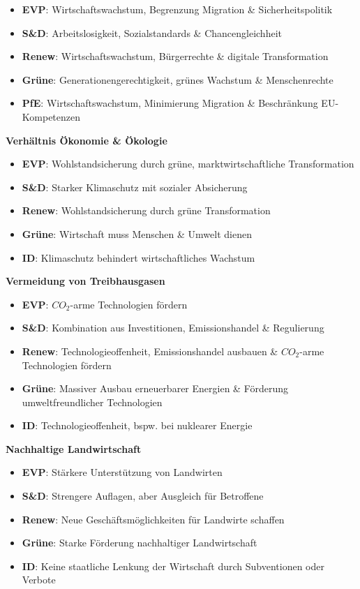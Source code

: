\documentclass[11pt]{article}
\newcommand{\themeOne}{Verhältnis \newline Ökonomie \& Ökologie}
\newcommand{\themeTwo}{Vermeidung von Treibhausgasen}
\newcommand{\themeThree}{Nachhaltige Landwirtschaft}
\newcommand{\evpOne}{\small Wohlstandsicherung durch grüne, marktwirtschaftliche Transformation}
\newcommand{\evpTwo}{\small $CO_2$-arme Technologien fördern}
\newcommand{\evpThree}{\small Stärkere Unterstützung von Landwirten}
\newcommand{\sdOne}{\small Starker Klimaschutz mit sozialer Absicherung}
\newcommand{\sdTwo}{\small Kombination aus Investitionen, Emissionshandel \& Regulierung}
\newcommand{\sdThree}{\small Strengere Auflagen, aber Ausgleich für Betroffene}
\newcommand{\reOne}{\small Wohlstandsicherung durch grüne Transformation}
\newcommand{\reTwo}{\small Technologieoffenheit, Emissionshandel ausbauen \& $CO_2$-arme Technologien fördern}
\newcommand{\reThree}{\small Neue Geschäftsmöglichkeiten für Landwirte schaffen}
\newcommand{\greenOne}{\small Wirtschaft muss Menschen \& Umwelt dienen}
\newcommand{\greenTwo}{\small Massiver Ausbau erneuerbarer Energien \& Förderung umweltfreundlicher Technologien}
\newcommand{\greenThree}{\small Starke Förderung nachhaltiger Landwirtschaft}
\newcommand{\idOne}{\small Klimaschutz behindert wirtschaftliches Wachstum}
\newcommand{\idTwo}{\small Technologieoffenheit, bspw. bei nuklearer Energie}
\newcommand{\idThree}{\small Keine staatliche Lenkung der Wirtschaft durch Subventionen oder Verbote}
\newcommand{\themeOne}{Lastenverteilung \newline in der EU}
\newcommand{\themeTwo}{Ausmaß der Kontrolle der EU-Außengrenzen}
\newcommand{\themeThree}{Strenge bezüglich Asylanträge \& Rückführungen}
\newcommand{\evpOne}{\small Fester Verteilungsmechanismus \& Asyl- und Migrationsfonds}
\newcommand{\evpTwo}{\small Stärkere Kontrolle \& Drittstaatenverfahren}
\newcommand{\evpThree}{\small Schnellere Rückführungen \& einheitliche Aufnahmebedingungen}
\newcommand{\sdOne}{\small Fester Verteilungsmechanismus, Asyl- und Migrationsfonds \& Unterstützung belastete Staaten}
\newcommand{\sdTwo}{\small Gesicherte Grenzen, aber keine Drittstaatenverfahren}
\newcommand{\sdThree}{\small Unterstützung bei Antrag \& Integration durch EASO}
\newcommand{\reOne}{\small Fester Verteilungsmechanismus \& Asyl- und Migrationsfonds}
\newcommand{\reTwo}{\small Stärkere Kontrolle \& Drittstaatenverfahren}
\newcommand{\reThree}{\small Schnellere Rückführungen \& einheitliche Aufnahmebedingungen}
\newcommand{\greenOne}{\small Fester Verteilungsmechanismus, Asyl- und Migrationsfonds \& Unterstützung belastete Staaten}
\newcommand{\greenTwo}{\small Ausbau der Seenotrettung \& Verhinderung von Drittstaatenverfahren}
\newcommand{\greenThree}{\small Humane Aufnahme von Schutzsuchenden \& Wahrung der Menschenrechte bei Rückführungen}
\newcommand{\idOne}{\small Keinerlei Verpflichtung der Mitgliedstaaten}
\newcommand{\idTwo}{\small Verhinderung illegaler Migration durch Abschottung}
\newcommand{\idThree}{\small Schnelle Rückführungen, maximal temporäre Aufnahme}
\newcommand{\themeOne}{Internationale \newline Kooperation}
\newcommand{\themeTwo}{Militärische vs. zivile Interventionen}
\newcommand{\themeThree}{Erhöhung von Verteidigungsausgaben}
\newcommand{\evpOne}{\small Ergänzung mit NATO \& keine Parallelstrukturen}
\newcommand{\evpTwo}{\small EU muss Truppen in Krisensituationen schicken können}
\newcommand{\evpThree}{\small Sowohl auf europäischer als auch nationaler Ebene}
\newcommand{\sdOne}{\small Ergänzung mit NATO \& keine Parallelstrukturen}
\newcommand{\sdTwo}{\small Auch Diplomatie \& Friedenssicherung vorantreiben}
\newcommand{\sdThree}{\small Sowohl auf europäischer als auch nationaler Ebene, aber v.a. effizientere Ausgaben}
\newcommand{\reOne}{\small Ergänzung mit NATO, aber selbstständige EU}
\newcommand{\reTwo}{\small Militärische Verteidigung der EU \& Unterstützung Verbündeter essenziell}
\newcommand{\reThree}{\small Sowohl auf europäischer als auch nationaler Ebene, aber v.a. effizientere Ausgaben}
\newcommand{\greenOne}{\small Enge Zusammenarbeit mit Demokratien, keine Waffen an Diktaturen}
\newcommand{\greenTwo}{\small Auch Diplomatie, Umweltschutz \& Entwicklungshilfe für langfristige Sicherheit}
\newcommand{\greenThree}{\small Eher verstärkte EU-Kooperation, um Ausgaben effizienter zu nutzen}
\newcommand{\idOne}{\small NATO nur als Verteidigungsbündnis \& eigenständige nationale Diplomatie}
\newcommand{\idTwo}{\small Militärische Landesverteidigung \& friedliche Zusammenarbeit}
\newcommand{\idThree}{\small Nationale Entscheidung über Verteidigungsausgaben}
\begin{document}
\begin{minipage}[t]{0.45\textwidth}
\begin{itemize}
        \item \textbf{EVP}: {\small Wirtschaftswachstum, Begrenzung Migration \& Sicherheitspolitik}
        \item \textbf{S\&D}: {\small Arbeitslosigkeit, Sozialstandards \& Chancengleichheit}
        \item \textbf{Renew}: {\small Wirtschaftswachstum, Bürgerrechte \& digitale Transformation}
        \item \textbf{Grüne}: {\small Generationengerechtigkeit, grünes Wachstum \& Menschenrechte}
        \item \textbf{PfE}: {\small Wirtschaftswachstum, Minimierung Migration \& Beschränkung EU-Kompetenzen}
    \end{itemize}
    
\end{minipage}%
\hfill
\begin{minipage}[t]{0.45\textwidth}
    \textbf{\Large \themeOne}
    \raggedright
    \begin{itemize}
        \item \textbf{EVP}: \evpOne
        \item \textbf{S\&D}: \sdOne
        \item \textbf{Renew}: \reOne
        \item \textbf{Grüne}: \greenOne
        \item \textbf{ID}: \idOne
    \end{itemize}
    \textbf{\Large \themeTwo}
    \raggedright
    \begin{itemize}
        \item \textbf{EVP}: \evpTwo
        \item \textbf{S\&D}: \sdTwo
        \item \textbf{Renew}: \reTwo
        \item \textbf{Grüne}: \greenTwo
        \item \textbf{ID}: \idTwo
    \end{itemize}
    \textbf{\Large \themeThree}
    \raggedright
    \begin{itemize}
        \item \textbf{EVP}: \evpThree
        \item \textbf{S\&D}: \sdThree
        \item \textbf{Renew}: \reThree
        \item \textbf{Grüne}: \greenThree
        \item \textbf{ID}: \idThree
    \end{itemize}
\end{minipage}
\end{document}
